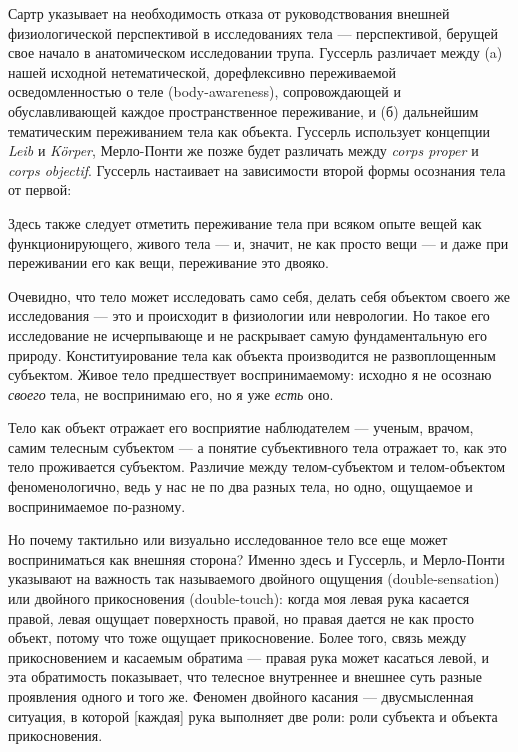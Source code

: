 \documentclass[11pt]{book}
\begin{document}
Сартр указывает на необходимость отказа от руководствования внешней физиологической перспективой в исследованиях тела --- перспективой, берущей свое начало в анатомическом исследовании трупа. Гуссерль различает между (a) нашей исходной нетематической, дорефлексивно переживаемой осведомленностью о теле (body-awareness), сопровождающей и обуславливающей каждое пространственное переживание, и (б) дальнейшим тематическим переживанием тела как объекта. Гуссерль использует концепции \textit{Leib} и \textit{Körper}, Мерло-Понти же позже будет различать между \textit{corps proper} и \textit{corps objectif}. Гуссерль настаивает на зависимости второй формы осознания тела от первой:

\smallskip
{}\relax
{}\relax

Здесь также следует отметить переживание тела при всяком опыте вещей как функционирующего, живого тела --- и, значит, не как просто вещи --- и даже при переживании его как вещи, переживание это двояко.

\relax
{}\relax
\smallskip

Очевидно, что тело может исследовать само себя, делать себя объектом своего же исследования --- это и происходит в физиологии или неврологии. Но такое его исследование не исчерпывающе и не раскрывает самую фундаментальную его природу. Конституирование тела как объекта производится не развоплощенным субъектом. Живое тело предшествует воспринимаемому: исходно я не осознаю \textit{своего} тела, не воспринимаю его, но я уже \textit{есть} оно.

Тело как объект отражает его восприятие наблюдателем --- ученым, врачом, самим телесным субъектом --- а понятие субъективного тела отражает то, как это тело проживается субъектом. Различие между телом-субъектом и телом-объектом феноменологично, ведь у нас не по два разных тела, но одно, ощущаемое и воспринимаемое по-разному.

Но почему тактильно или визуально исследованное тело все еще может восприниматься как внешняя сторона? Именно здесь и Гуссерль, и Мерло-Понти указывают на важность так называемого двойного ощущения (double-sensation) или двойного прикосновения (double-touch): когда моя левая рука касается правой, левая ощущает поверхность правой, но правая дается не как просто объект, потому что тоже ощущает прикосновение. Более того, связь между прикосновением и касаемым обратима --- правая рука может касаться левой, и эта обратимость показывает, что телесное внутреннее и внешнее суть разные проявления одного и того же. Феномен двойного касания --- двусмысленная ситуация, в которой [каждая] рука выполняет две роли: роли субъекта и объекта прикосновения.
\end{document}
